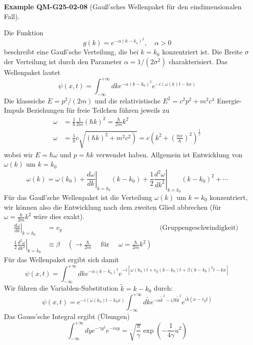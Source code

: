 \documentclass[10pt, letterpaper]{article}
\newcommand{\CustomHeading}[3]{%
  \par\medskip\noindent%
  \textbf{#1 #2} \textnormal{(#3)}.\enskip%
}
\newenvironment{EXA}[2]{\CustomHeading{Example}{#1}{#2}}{}
\begin{document}
\begin{EXA}{QM-G25-02-08}{Gauß'sches Wellenpaket für den eindimensionalen Fall}
Die Funktion
$$
g(k)=e^{-\alpha\left(k-k_{o}\right)^{2}}, \quad \alpha>0
$$
beschreibt eine Gauß'sche Verteilung, die bei $k=k_{0}$ konzentriert ist. Die Breite $\sigma$ der Verteilung ist durch den Parameter $\alpha=1 /\left(2 \sigma^{2}\right)$ charakterisiert. Das Wellenpaket lautet
$$
\psi(x, t)=\int_{-\infty}^{+\infty} d k e^{-\alpha\left(k-k_{0}\right)^{2}} e^{-i(\omega(k) t-k x)}
$$
Die klasssiche $E=p^{2} /(2 m)$ und die relativistische $E^{2}=c^{2} p^{2}+m^{2} c^{4}$ Energie-Impuls Beziehungen für freie Teilchen führen jeweils zu
$$
\begin{aligned}
\omega & =\frac{1}{\hbar} \frac{1}{2 m}(\hbar k)^{2}=\frac{\hbar}{2 m} k^{2} \\
\omega & =\frac{1}{\hbar} c \sqrt{\left.(\hbar k)^{2}+m^{2} c^{2}\right)}=c\left(k^{2}+\left(\frac{m c}{\hbar}\right)^{2}\right)^{\frac{1}{2}}
\end{aligned}
$$
wobei wir $E=\hbar \omega$ und $p=\hbar k$ verwendet haben. Allgemein ist Entwicklung von $\omega(k)$ um $k=k_{0}$
$$
\omega(k)=\omega\left(k_{0}\right)+\left.\frac{d \omega}{d k}\right|_{k=k_{0}}\left(k-k_{0}\right)+\left.\frac{1}{2} \frac{d^{2} \omega}{d k^{2}}\right|_{k=k_{0}}\left(k-k_{0}\right)^{2}+\cdots
$$
Für das Gauß'sche Wellenpaket ist die Verteilung $\omega(k)$ um $k=k_{0}$ konzentriert, wir können also die Entwicklung nach dem zweiten Glied abbrechen (für $\omega=\frac{\hbar}{2 m} k^{2}$ wäre dies exakt).
$$
\begin{array}{rlrl}
\left.\frac{d \omega}{d k}\right|_{k=k_{0}} & =v_{g} & & \text { (Gruppengeschwindigkeit) } \\
\left.\frac{1}{2} \frac{d^{2} \omega}{d k^{2}}\right|_{k=k_{0}} & \equiv \beta & \left(\rightarrow \frac{\hbar}{2 m} \quad \text { für } \quad \omega=\frac{\hbar}{2 m} k^{2}\right)
\end{array}
$$
Für das Wellenpaket ergibt sich damit
$$
\psi(x, t)=\int_{-\infty}^{+\infty} d k e^{-\alpha\left(k-k_{0}\right)^{2}} e^{-i\left[\omega\left(k_{0}\right) t+v_{g}\left(k-k_{0}\right) t+\beta\left(k-k_{0}\right)^{2} t-k x\right]}
$$
Wir führen die Variablen-Substitution $\tilde{k}=k-k_{0}$ durch:
$$
\psi(x, t)=e^{-i\left(\omega\left(k_{0}\right) t-k_{0} x\right)} \int_{-\infty}^{+\infty} d \tilde{k} e^{-\alpha \tilde{k}^{2}-i \beta t \tilde{k}^{2}} e^{i \tilde{k}\left(x-v_{g} t\right)}
$$
Das Gauss'sche Integral ergibt (Übungen)
$$
\int_{-\infty}^{+\infty} d y e^{-\gamma y^{2}} e^{-i u y}=\sqrt{\frac{\pi}{\gamma}} \exp \left(-\frac{1}{4 \gamma} u^{2}\right)
$$


\end{EXA}
\end{document}
